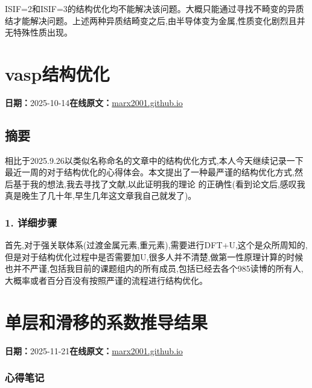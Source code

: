 \documentclass[lang=cn,scheme=chinese,color=blue,device=normal,toc=onecol,math=cm]{elegantbook}
\begin{document}
ISIF=2和ISIF=3的结构优化均不能解决该问题。大概只能通过寻找不畸变的异质结才能解决问题。上述两种异质结畸变之后,由半导体变为金属,性质变化剧烈且并无特殊性质出现。\par



\section{vasp结构优化}
\begin{articlemeta}
\textbf{日期：}2025-10-14\hfill\textbf{在线原文：}\href{https://marx2001.github.io/sci-note\_posts/20250926-geo2}{marx2001.github.io}
\end{articlemeta}

\subsection{摘要}


相比于2025.9.26以类似名称命名的文章中的结构优化方式,本人今天继续记录一下最近一周的对于结构优化的心得体会。本文提出了一种最严谨的结构优化方式,然后基于我的想法,我去寻找了文献,以此证明我的理论 的正确性(看到论文后,感叹我真是晚生了几十年,早生几年这文章我自己就发了)。\par


\subsubsection{1. 详细步骤}


首先,对于强关联体系(过渡金属元素,重元素),需要进行DFT+U,这个是众所周知的,但是对于结构优化过程中是否需要加U,很多人并不清楚,做第一性原理计算的时候也并不严谨,包括我目前的课题组内的所有成员,包括已经去各个985读博的所有人,大概率或者百分百没有按照严谨的流程进行结构优化。\par



\section{单层和滑移的系数推导结果}
\begin{articlemeta}
\textbf{日期：}2025-11-21\hfill\textbf{在线原文：}\href{https://marx2001.github.io/sci-note\_posts/20251121-m}{marx2001.github.io}
\end{articlemeta}

\subsubsection{心得笔记}
\end{document}
